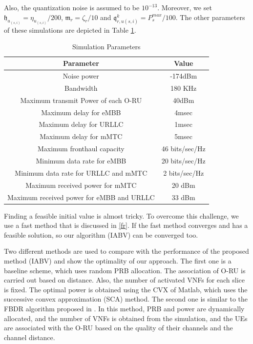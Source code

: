 \documentclass[conference]{IEEEtran}
\begin{document}
Also, the quantization noise is assumed to be $10^{-13}$.
Moreover, we set $\mathfrak{h}_{u_{(s,i)}} = \eta_{u_{(s,i)}}/200$, $\mathfrak{m}_{r} = \zeta_r/10$
and $\mathfrak{q}^k_{r,u(s,i)} = P_{s}^{max}/100$. The other parameters of these simulations are depicted in Table \ref{table:1a}.
\begin{table}
 \caption {Simulation Parameters} \label{table:1a}
 \begin{center}
  \begin{tabular}{||c | c ||}
  \hline
Parameter & Value \\ [0.5ex]
  \hline\hline
  Noise power & -174dBm\\
  \hline
  Bandwidth & 180 KHz \\
  \hline
 Maximum transmit Power of each O-RU & 40dBm \\
  \hline
  Maximum delay for eMBB &  4msec \\
  \hline
    Maximum delay for URLLC &  1msec \\
  \hline
  Maximum delay for mMTC &  5msec \\
  \hline
  Maximum fronthaul capacity  & 46 bits/sec/Hz \\
   \hline
  Minimum data rate for eMBB &  20 bits/sec/Hz \\ 
  \hline
   Minimum data rate for URLLC and mMTC &  2 bits/sec/Hz \\ 
  \hline
   Maximum received power for mMTC &  20 dBm \\ [.5ex]   
  \hline
    Maximum received power for eMBB and URLLC &  33 dBm \\ [.5ex]   
  \hline
 \end{tabular}
 \end{center}
 \end{table}
 
Finding a feasible initial value is almost tricky. To overcome this challenge, we use a fast method that is discussed in \ref{fr}. If the fast method converges and has a feasible solution, so our algorithm (IABV) can be converged too.

Two different methods are used to compare with the performance of the proposed method (IABV) and show the optimality of our approach.
 The first one is a baseline scheme, which uses random PRB allocation. The association of O-RU is carried out based on distance. Also, the number of activated VNFs for each slice is fixed. The optimal power is obtained using the CVX of Matlab, which uses the successive convex approximation (SCA) method. The second one is similar to the FBDR algorithm proposed in \cite{lee2018dynamic}. In this method, PRB and power are dynamically allocated, and the number of VNFs is obtained from the simulation, and the UEs are associated with the O-RU based on the quality of their channels and the channel distance.
\end{document}
